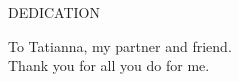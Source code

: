 \newpage
{}

\begin{center}
  DEDICATION
\end{center}

\begin{center}
  To Tatianna, my partner and friend.\\
  Thank you for all you do for me.
\end{center}
